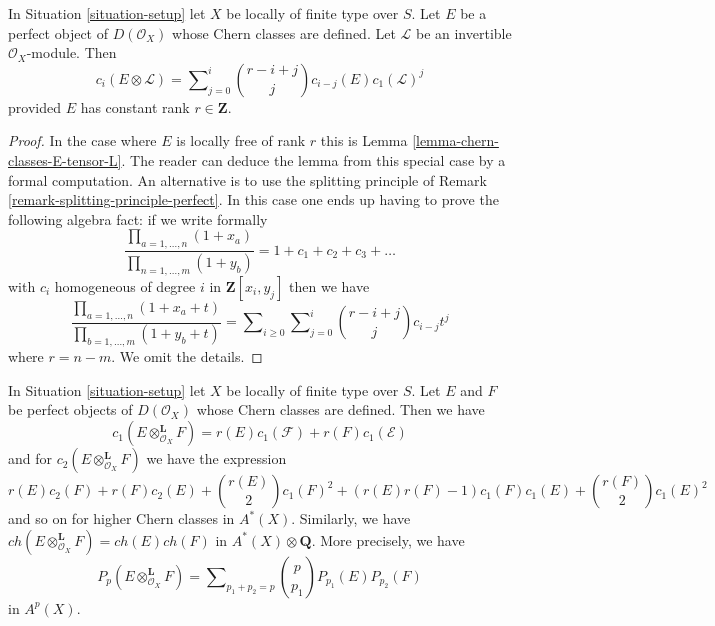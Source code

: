 \begin{lemma}
\label{lemma-chern-class-perfect-tensor-invertible}
In Situation \ref{situation-setup} let $X$ be locally of finite type over $S$.
Let $E$ be a perfect object of $D(\mathcal{O}_X)$ whose Chern classes
are defined.
Let $\mathcal{L}$ be an invertible $\mathcal{O}_X$-module. Then
$$
c_i(E \otimes \mathcal{L}) =
\sum\nolimits_{j = 0}^i
\binom{r - i + j}{j} c_{i - j}(E) c_1(\mathcal{L})^j
$$
provided $E$ has constant rank $r \in \mathbf{Z}$.
\end{lemma}

\begin{proof}
In the case where $E$ is locally free of rank $r$ this is
Lemma \ref{lemma-chern-classes-E-tensor-L}. The reader can deduce
the lemma from this special case by a formal computation.
An alternative is to use the splitting principle of
Remark \ref{remark-splitting-principle-perfect}.
In this case one ends up having to prove the following
algebra fact: if we write formally
$$
\frac{\prod_{a = 1, \ldots, n} (1 + x_a)}{\prod_{n = 1, \ldots, m} (1 + y_b)}
= 1 + c_1 + c_2 + c_3 + \ldots
$$
with $c_i$ homogeneous of degree $i$
in $\mathbf{Z}[x_i, y_j]$ then we have
$$
\frac{\prod_{a = 1, \ldots, n} (1 + x_a + t)}{\prod_{b = 1, \ldots, m} (1 + y_b + t)}
= \sum\nolimits_{i \geq 0} \sum\nolimits_{j = 0}^i
\binom{r - i + j}{j} c_{i - j} t^j
$$
where $r = n - m$. We omit the details.
\end{proof}

\begin{lemma}
\label{lemma-chern-classes-perfect-tensor-product}
In Situation \ref{situation-setup} let $X$ be locally of finite type over $S$.
Let $E$ and $F$ be perfect objects of $D(\mathcal{O}_X)$ whose Chern classes
are defined. Then we have
$$
c_1(E \otimes_{\mathcal{O}_X}^\mathbf{L} F) =
r(E) c_1(\mathcal{F}) + r(F) c_1(\mathcal{E})
$$
and for $c_2(E \otimes_{\mathcal{O}_X}^\mathbf{L} F)$ we have the expression
$$
r(E) c_2(F) + r(F) c_2(E) + {r(E) \choose 2} c_1(F)^2 +
(r(E)r(F) - 1) c_1(F)c_1(E) + {r(F) \choose 2} c_1(E)^2
$$
and so on for higher Chern classes in $A^*(X)$. Similarly, we have
$ch(E \otimes_{\mathcal{O}_X}^\mathbf{L} F) = ch(E) ch(F)$
in $A^*(X) \otimes \mathbf{Q}$. More precisely, we have
$$
P_p(E \otimes_{\mathcal{O}_X}^\mathbf{L} F) = \sum\nolimits_{p_1 + p_2 = p}
{p \choose p_1} P_{p_1}(E) P_{p_2}(F)
$$
in $A^p(X)$.
\end{lemma}

